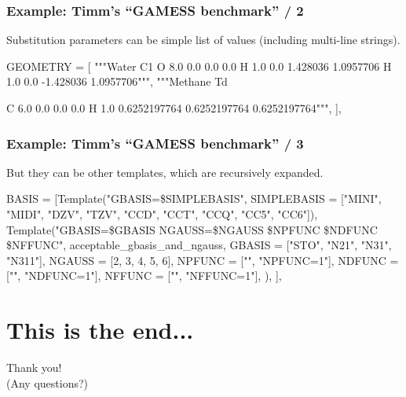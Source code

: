 \documentclass {beamer}
\newcommand{\largeskip}{\vspace{1em}}
\def\+{\largeskip}
\begin{document}
\begin{frame}[fragile]
  \frametitle{Example: Timm's ``GAMESS benchmark'' / 2}

  Substitution parameters can be simple list of values (including
  multi-line strings).

  \begin{scriptsize}
\begin{semiverbatim}
GEOMETRY = [
        """Water
C1
O   8.0        0.0              0.0                    0.0
H   1.0        0.0              1.428036               1.0957706
H   1.0        0.0             -1.428036               1.0957706""",
        """Methane
Td

C     6.0   0.0            0.0            0.0
H     1.0   0.6252197764   0.6252197764   0.6252197764""",
        ],
\end{semiverbatim}
  \end{scriptsize}
\end{frame}

\begin{frame}[fragile]
  \frametitle{Example: Timm's ``GAMESS benchmark'' / 3}

  But they can be other templates, which are recursively expanded.
  \begin{scriptsize}
\begin{semiverbatim}
BASIS = [Template("GBASIS=\${SIMPLEBASIS}",
                  SIMPLEBASIS = ["MINI", "MIDI", "DZV", "TZV", 
                                 "CCD", "CCT", "CCQ", "CC5", "CC6"]),
         Template("GBASIS=\${GBASIS} NGAUSS=\${NGAUSS} \${NPFUNC} \${NDFUNC} \${NFFUNC}",
                  acceptable_gbasis_and_ngauss,
                  GBASIS = ["STO", "N21", "N31", "N311"],
                  NGAUSS = [2, 3, 4, 5, 6],
                  NPFUNC = ["", "NPFUNC=1"],
                  NDFUNC = ["", "NDFUNC=1"],
                  NFFUNC = ["", "NFFUNC=1"],
                  ),
         ],
\end{semiverbatim}
  \end{scriptsize}
\end{frame}

\section{This is the end...}
\label{sec:end}

\begin{frame}
  \begin{center}
    {\Huge Thank you!}
    \\
    \+
    {\Large (Any questions?)}
  \end{center}
\end{frame}
\end{document}
